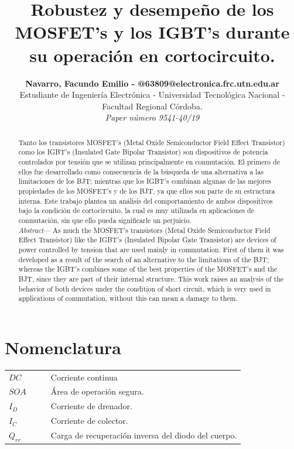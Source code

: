 \documentclass[conference]{IEEEtran}
\begin{document}
\title{Robustez y desempeño de los MOSFET's y los IGBT's durante su operación en cortocircuito.}
\author{
		\begin{tabular}{c}
			\textbf{Navarro, Facundo Emilio - @63809@electronica.frc.utn.edu.ar} \\ 
			Estudiante de Ingeniería Electrónica - Universidad Tecnológica Nacional - Facultad Regional Córdoba.\\
	\textit{Paper número 9541-40/19}
		\end{tabular}
		}
\maketitle

\begin{abstract}
Tanto los transistores MOSFET's (Metal Oxide Semiconductor Field Effect Transistor) como los IGBT's (Insulated Gate Bipolar Transistor) son dispositivos de potencia controlados por tensión que se utilizan principalmente en conmutación. El primero de ellos fue desarrollado como consecuencia de la búsqueda de una alternativa a las limitaciones de los BJT; mientras que los IGBT's combinan algunas de las mejores propiedades de los MOSFET's y de los BJT, ya que ellos son parte de su estructura interna. Este trabajo plantea un análisis del comportamiento de ambos dispositivos bajo la condición de cortocircuito, la cual es muy utilizada en aplicaciones de conmutación, sin que ello pueda significarle un perjuicio.\\

\textit{Abstract}--- As much the MOSFET's transistors (Metal Oxide Semiconductor Field Effect Transistor) like the IGBT's (Insulated Bipolar Gate Transistor) are devices of power controlled by tension that are used mainly in commutation.  First of them it was developed as a result of the search of an alternative to the limitations of the BJT;  whereas the IGBT's combines some of the best properties of the MOSFET's and the BJT, since they are part of their internal structure.  This work raises an analysis of the behavior of both devices under the condition of short circuit, which is very used in applications of commutation, without this can mean a damage to them.
\end{abstract} 

\IEEEpeerreviewmaketitle

\section*{Nomenclatura}
\begin{table}[H]
\centering
\begin{tabular}{lccl}
$DC$    & & & Corriente continua        \\
$SOA$  	& & & Área de operación segura. \\
$I_D$ 	& & & Corriente de drenador.   	\\
$I_C$ 	& & & Corriente de colector.  	\\
$Q_{rr}$& & & Carga de recuperación inversa del diodo del cuerpo.
\end{tabular}
\end{table}
\end{document}
